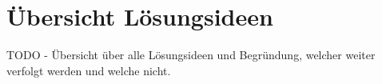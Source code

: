 \section{Übersicht Lösungsideen}
TODO - Übersicht über alle Lösungsideen und Begründung, welcher weiter verfolgt werden und welche nicht.